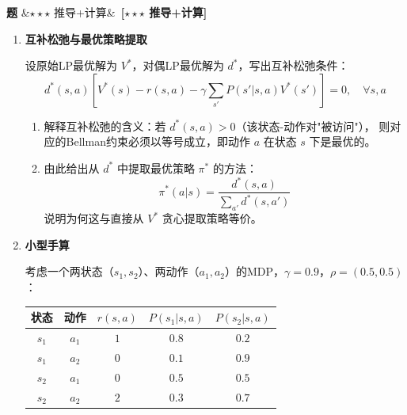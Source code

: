 \documentclass[12pt, a4paper]{article}
\newcounter{probcnt}
\newenvironment{problem}[1][]{%
  \stepcounter{probcnt}
  \begin{mdframed}[linecolor=black!30, backgroundcolor=gray!4,
    innertopmargin=8pt, innerbottommargin=8pt,
    innerleftmargin=10pt, innerrightmargin=10pt,
    skipabove=10pt, skipbelow=4pt]
  \noindent\textbf{题 \theprobcnt}\ifx&#1&\else\ \textbf{[#1]}\fi\quad
}{%
  \end{mdframed}
}
\newenvironment{subproblems}{%
  \begin{enumerate}[label=(\alph*), leftmargin=1.5em, topsep=4pt, itemsep=2pt]
}{%
  \end{enumerate}
}
\begin{document}
\begin{problem}[$\star\star\star$ 推导+计算]
\begin{subproblems}
  引入对偶变量 $d(s,a) \geq 0$（对应每条约束 $V(s) \geq r(s,a) + \cdots$），写出原始LP的对偶问题：
  \[
    \max_{d \geq 0} \quad \sum_{s,a} r(s,a)\, d(s,a)
    \quad \text{s.t.} \quad
    \sum_a d(s,a) - \gamma \sum_{s',a'} P(s|s',a')\, d(s',a') = \rho(s),
    \quad \forall s \in \mathcal{S}
  \]
  \begin{enumerate}[label=(\roman*), topsep=2pt, itemsep=1pt]
    \item 推导该对偶问题（从Lagrangian出发，对 $V$ 求极小并整理）。
    \item 证明弱对偶：原始LP目标值 $\geq$ 对偶LP目标值（即 $\sum_s \rho(s) V(s) \geq \sum_{s,a} r(s,a) d(s,a)$
          对任意原始可行 $V$ 和对偶可行 $d$ 均成立）。
    \item 指出强对偶成立的条件，并说明此时 $d^*(s,a)$ 的概率论含义：
          \[
            d^*(s,a) = \sum_{t=0}^{\infty} \gamma^t \Pr(s_t = s,\ a_t = a \mid \pi^*,\ s_0 \sim \rho)
          \]
          解释 $d^*(s,a)$ 为何称为"折扣状态-动作占用度量"。
  \end{enumerate}

  \item \textbf{互补松弛与最优策略提取}

  设原始LP最优解为 $V^*$，对偶LP最优解为 $d^*$，写出互补松弛条件：
  \[
    d^*(s,a)\left[V^*(s) - r(s,a) - \gamma \sum_{s'} P(s'|s,a) V^*(s')\right] = 0,
    \quad \forall s, a
  \]
  \begin{enumerate}[label=(\roman*), topsep=2pt, itemsep=1pt]
    \item 解释互补松弛的含义：若 $d^*(s,a) > 0$（该状态-动作对"被访问"），
          则对应的Bellman约束必须以等号成立，即动作 $a$ 在状态 $s$ 下是最优的。
    \item 由此给出从 $d^*$ 中提取最优策略 $\pi^*$ 的方法：
          \[
            \pi^*(a|s) = \frac{d^*(s,a)}{\sum_{a'} d^*(s,a')}
          \]
          说明为何这与直接从 $V^*$ 贪心提取策略等价。
  \end{enumerate}

  \item \textbf{小型手算}

  考虑一个两状态（$s_1, s_2$）、两动作（$a_1, a_2$）的MDP，$\gamma = 0.9$，$\rho = (0.5, 0.5)$：

  \begin{center}
  \begin{tabular}{ccccc}
    \toprule
    状态 & 动作 & $r(s,a)$ & $P(s_1|s,a)$ & $P(s_2|s,a)$ \\
    \midrule
    $s_1$ & $a_1$ & $1$ & $0.8$ & $0.2$ \\
    $s_1$ & $a_2$ & $0$ & $0.1$ & $0.9$ \\
    $s_2$ & $a_1$ & $0$ & $0.5$ & $0.5$ \\
    $s_2$ & $a_2$ & $2$ & $0.3$ & $0.7$ \\
    \bottomrule
  \end{tabular}
  \end{center}


\end{subproblems}
\end{problem}
\end{document}
